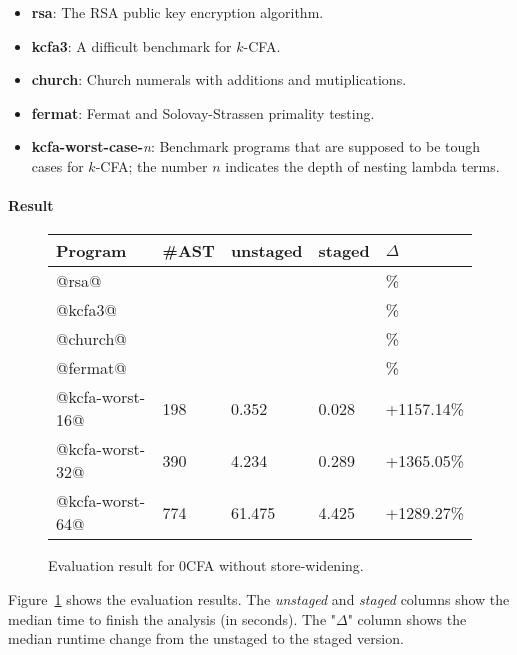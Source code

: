 \begin{itemize}
  \item \textbf{rsa}: The RSA public key encryption algorithm.
  \item \textbf{kcfa3}: A difficult benchmark for $k$-CFA.
  \item \textbf{church}: Church numerals with additions and mutiplications.
  \item \textbf{fermat}: Fermat and Solovay-Strassen primality testing.
  \item \textbf{kcfa-worst-case-}\textit{n}: 
    Benchmark programs that are supposed to be tough cases for $k$-CFA; 
    the number $n$ indicates the depth of nesting lambda terms.
\end{itemize}

\paragraph{Result}

\begin{figure}[h]
\tiny
\begin{tabular}{@{}lllll@{}}
\toprule
    Program          &\#AST & unstaged   & staged     & $\Delta$ \\ \midrule
    @rsa@            &      &            &            & \%          \\
    @kcfa3@          &      &            &            & \%          \\
    @church@         &      &            &            & \%          \\
    @fermat@         &      &            &            & \%          \\
    @kcfa-worst-16@  &  198 & 0.352      & 0.028      & +1157.14\%        \\
    @kcfa-worst-32@  &  390 & 4.234      & 0.289      & +1365.05\%          \\
    @kcfa-worst-64@  &  774 & 61.475     & 4.425      & +1289.27\%         \\
    \bottomrule
\end{tabular}
\caption{Evaluation result for 0CFA without store-widening.} \label{evaluation_result}
\end{figure}

Figure~\ref{evaluation_result} shows the evaluation results. The
\textit{unstaged} and \textit{staged} columns show the median time to finish the
analysis (in seconds). The "$\Delta$" column shows the median runtime change
from the unstaged to the staged version. 

